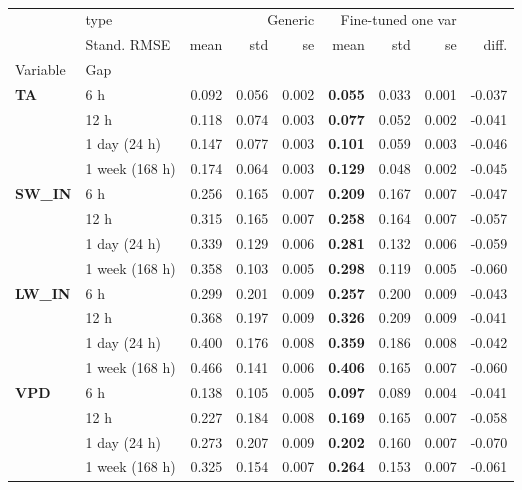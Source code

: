 \begin{table}
\centering
\caption{\CapGeneric}
\label{tbl:generic}
\begin{tabular}{p{2.1cm}l|rrr|rrr|r}
\toprule
 & type & \multicolumn{3}{r}{Generic} & \multicolumn{3}{r}{Fine-tuned one var} &  \\
 & Stand. RMSE & mean & std & se & mean & std & se & diff. \\
Variable & Gap &  &  &  &  &  &  &  \\
\midrule
\multirow[c]{4}{*}{\textbf{TA}} & 6 h & 0.092 & 0.056 & 0.002 & \bfseries 0.055 & 0.033 & 0.001 & -0.037 \\
 & 12 h & 0.118 & 0.074 & 0.003 & \bfseries 0.077 & 0.052 & 0.002 & -0.041 \\
 & 1 day (24 h) & 0.147 & 0.077 & 0.003 & \bfseries 0.101 & 0.059 & 0.003 & -0.046 \\
 & 1 week (168 h) & 0.174 & 0.064 & 0.003 & \bfseries 0.129 & 0.048 & 0.002 & -0.045 \\
\cline{1-9}
\multirow[c]{4}{*}{\textbf{SW\_IN}} & 6 h & 0.256 & 0.165 & 0.007 & \bfseries 0.209 & 0.167 & 0.007 & -0.047 \\
 & 12 h & 0.315 & 0.165 & 0.007 & \bfseries 0.258 & 0.164 & 0.007 & -0.057 \\
 & 1 day (24 h) & 0.339 & 0.129 & 0.006 & \bfseries 0.281 & 0.132 & 0.006 & -0.059 \\
 & 1 week (168 h) & 0.358 & 0.103 & 0.005 & \bfseries 0.298 & 0.119 & 0.005 & -0.060 \\
\cline{1-9}
\multirow[c]{4}{*}{\textbf{LW\_IN}} & 6 h & 0.299 & 0.201 & 0.009 & \bfseries 0.257 & 0.200 & 0.009 & -0.043 \\
 & 12 h & 0.368 & 0.197 & 0.009 & \bfseries 0.326 & 0.209 & 0.009 & -0.041 \\
 & 1 day (24 h) & 0.400 & 0.176 & 0.008 & \bfseries 0.359 & 0.186 & 0.008 & -0.042 \\
 & 1 week (168 h) & 0.466 & 0.141 & 0.006 & \bfseries 0.406 & 0.165 & 0.007 & -0.060 \\
\cline{1-9}
\multirow[c]{4}{*}{\textbf{VPD}} & 6 h & 0.138 & 0.105 & 0.005 & \bfseries 0.097 & 0.089 & 0.004 & -0.041 \\
 & 12 h & 0.227 & 0.184 & 0.008 & \bfseries 0.169 & 0.165 & 0.007 & -0.058 \\
 & 1 day (24 h) & 0.273 & 0.207 & 0.009 & \bfseries 0.202 & 0.160 & 0.007 & -0.070 \\
 & 1 week (168 h) & 0.325 & 0.154 & 0.007 & \bfseries 0.264 & 0.153 & 0.007 & -0.061 \\

\end{tabular}
\end{table}
